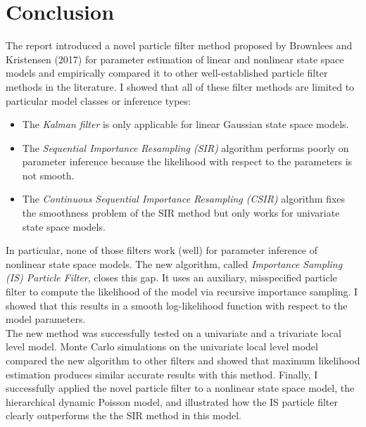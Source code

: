 \documentclass[11pt, oneside]{scrreprt}   	%
\begin{document}
\chapter{Conclusion}
\label{chp:conclusion}


The report introduced a novel particle filter method proposed by Brownlees and Kristensen (2017) for parameter estimation of linear and nonlinear state space models and empirically compared it to other well-established particle filter methods in the literature. I showed that all of these filter methods are limited to particular model classes or inference types: 
\begin{itemize}
  \item The \textit{Kalman filter} is only applicable for linear Gaussian state space models. 
  \item The \textit{Sequential Importance Resampling (SIR)} algorithm performs poorly on parameter inference because the likelihood with respect to the parameters is not smooth.
  \item The \textit{Continuous Sequential Importance Resampling (CSIR)} algorithm fixes the smoothness problem of the SIR method but only works for univariate state space models.  
\end{itemize}
In particular, none of those filters work (well) for parameter inference of nonlinear state space models.
The new algorithm, called \textit{Importance Sampling (IS) Particle Filter}, closes this gap. It uses an auxiliary, misspecified particle filter to compute the likelihood of the model via recursive importance sampling. I showed that this results in a smooth log-likelihood function with respect to the model parameters. \\

The new method was successfully tested on a univariate and a trivariate local level model. Monte Carlo simulations on the univariate local level model compared the new algorithm to other filters and showed that maximum likelihood estimation produces similar accurate results with this method. Finally, I successfully applied the novel particle filter to a nonlinear state space model, the hierarchical dynamic Poisson model, and illustrated how the IS particle filter clearly outperforms the the SIR method in this model. \\
\end{document}
